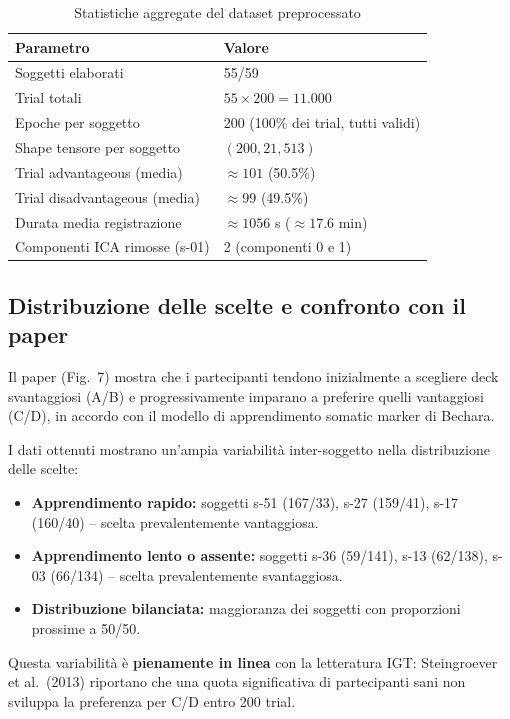 \documentclass[12pt, a4paper]{article}
\begin{document}
\begin{table}[h!]
\centering
\caption{Statistiche aggregate del dataset preprocessato}
\begin{tabular}{ll}
\toprule
\textbf{Parametro} & \textbf{Valore} \\
\midrule
Soggetti elaborati & 55/59 \\
Trial totali & $55 \times 200 = 11.000$ \\
Epoche per soggetto & 200 (100\% dei trial, tutti validi) \\
Shape tensore per soggetto & $(200, 21, 513)$ \\
Trial advantageous (media) & $\approx 101$ (50.5\%) \\
Trial disadvantageous (media) & $\approx 99$ (49.5\%) \\
Durata media registrazione & $\approx 1056$ s ($\approx 17.6$ min) \\
Componenti ICA rimosse (s-01) & 2 (componenti 0 e 1) \\
\bottomrule
\end{tabular}
\end{table}

\subsection{Distribuzione delle scelte e confronto con il paper}

Il paper (Fig.\ 7) mostra che i partecipanti tendono inizialmente a scegliere deck svantaggiosi (A/B) e progressivamente imparano a preferire quelli vantaggiosi (C/D), in accordo con il modello di apprendimento somatic marker di Bechara.

I dati ottenuti mostrano un'ampia variabilità inter-soggetto nella distribuzione delle scelte:

\begin{itemize}
    \item \textbf{Apprendimento rapido:} soggetti s-51 (167/33), s-27 (159/41), s-17 (160/40) -- scelta prevalentemente vantaggiosa.
    \item \textbf{Apprendimento lento o assente:} soggetti s-36 (59/141), s-13 (62/138), s-03 (66/134) -- scelta prevalentemente svantaggiosa.
    \item \textbf{Distribuzione bilanciata:} maggioranza dei soggetti con proporzioni prossime a 50/50.
\end{itemize}

Questa variabilità è \textbf{pienamente in linea} con la letteratura IGT: Steingroever et al.\ (2013) riportano che una quota significativa di partecipanti sani non sviluppa la preferenza per C/D entro 200 trial.
\end{document}

